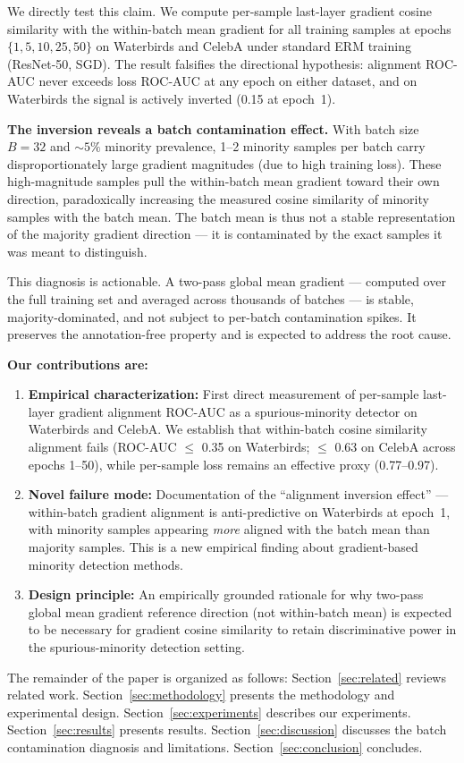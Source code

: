 We directly test this claim.
We compute per-sample last-layer gradient cosine similarity with the within-batch mean gradient for all training samples at epochs $\{1, 5, 10, 25, 50\}$ on Waterbirds and CelebA under standard ERM training (ResNet-50, SGD).
The result falsifies the directional hypothesis: alignment ROC-AUC never exceeds loss ROC-AUC at any epoch on either dataset, and on Waterbirds the signal is actively inverted (0.15 at epoch~1).

\textbf{The inversion reveals a batch contamination effect.}
With batch size $B = 32$ and ${\sim}5\%$ minority prevalence, 1--2 minority samples per batch carry disproportionately large gradient magnitudes (due to high training loss).
These high-magnitude samples pull the within-batch mean gradient toward their own direction, paradoxically increasing the measured cosine similarity of minority samples with the batch mean.
The batch mean is thus not a stable representation of the majority gradient direction --- it is contaminated by the exact samples it was meant to distinguish.

This diagnosis is actionable.
A two-pass global mean gradient --- computed over the full training set and averaged across thousands of batches --- is stable, majority-dominated, and not subject to per-batch contamination spikes.
It preserves the annotation-free property and is expected to address the root cause.

\textbf{Our contributions are:}
\begin{enumerate}
  \item \textbf{Empirical characterization:} First direct measurement of per-sample last-layer gradient alignment ROC-AUC as a spurious-minority detector on Waterbirds and CelebA. We establish that within-batch cosine similarity alignment fails (ROC-AUC $\leq$ 0.35 on Waterbirds; $\leq$ 0.63 on CelebA across epochs 1--50), while per-sample loss remains an effective proxy (0.77--0.97).

  \item \textbf{Novel failure mode:} Documentation of the ``alignment inversion effect'' --- within-batch gradient alignment is anti-predictive on Waterbirds at epoch~1, with minority samples appearing \emph{more} aligned with the batch mean than majority samples. This is a new empirical finding about gradient-based minority detection methods.

  \item \textbf{Design principle:} An empirically grounded rationale for why two-pass global mean gradient reference direction (not within-batch mean) is expected to be necessary for gradient cosine similarity to retain discriminative power in the spurious-minority detection setting.
\end{enumerate}

The remainder of the paper is organized as follows: Section~\ref{sec:related} reviews related work. Section~\ref{sec:methodology} presents the methodology and experimental design. Section~\ref{sec:experiments} describes our experiments. Section~\ref{sec:results} presents results. Section~\ref{sec:discussion} discusses the batch contamination diagnosis and limitations. Section~\ref{sec:conclusion} concludes.
